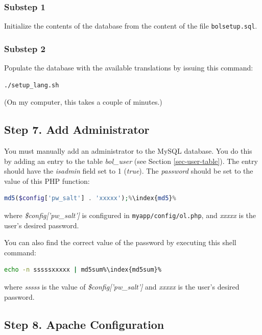 \documentclass[11pt,oneside,a4paper]{memoir}
\newcommand{\q}{{\mainnolig '}}
\begin{document}
\subsubsection*{Substep 1}

Initialize the contents of the database from the content of the file \texttt{bolsetup.sql}.


\subsubsection*{Substep 2}

Populate the database with the available translations by issuing this command:

\begin{lstlisting}[language=bash]
./setup_lang.sh
\end{lstlisting}

(On my computer, this takes a couple of minutes.)

\subsection{Step 7. Add Administrator}

You must manually add an administrator to the MySQL database. You do this by adding an entry to the
table \emph{bol\_user} (see Section \ref{sec-user-table}).
The entry should have the \emph{isadmin} field set to 1 (\emph{true}). The
\emph{password} should be set to the value of this PHP function:

\begin{lstlisting}[language=PHP]
md5($config['pw_salt'] . 'xxxxx');%\index{md5}%
\end{lstlisting}

\noindent
where \emph{\$config[\q pw\_salt\q]} is configured in \texttt{myapp/config/ol.php}, and
\emph{xxxxx} is the user's desired password.

You can also find the correct value of the password by executing this shell command:

\begin{lstlisting}[language=bash]
echo -n sssssxxxxx | md5sum%\index{md5sum}%
\end{lstlisting}

\noindent
where \emph{sssss} is the value of \emph{\$config[\q pw\_salt\q]} and \emph{xxxxx} is the user's
desired password.


\subsection{Step 8. Apache Configuration}
\end{document}
